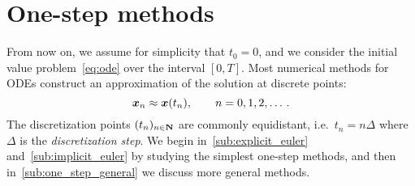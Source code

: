 
\section{One-step methods}
\label{sec:one-step_methods}
From now on, we assume for simplicity that $t_0 = 0$,
and we consider the initial value problem~\eqref{eq:ode} over the interval $[0, T]$.
Most numerical methods for ODEs construct an approximation of the solution at discrete points:
\[
    \mathbf{\boldsymbol{x}}_n \approx \mathbf{\boldsymbol{x}}(t_n), \qquad n = 0, 1, 2, \dotsc.
\]
The discretization points $(t_n)_{n \in \mathbf N}$ are commonly equidistant,
i.e.~$t_n = n \Delta$ where $\Delta$ is the \emph{discretization step}.
We begin in~\cref{sub:explicit_euler} and~\cref{sub:implicit_euler} by studying the simplest one-step methods,
and then in~\cref{sub:one_step_general} we discuss more general methods.

